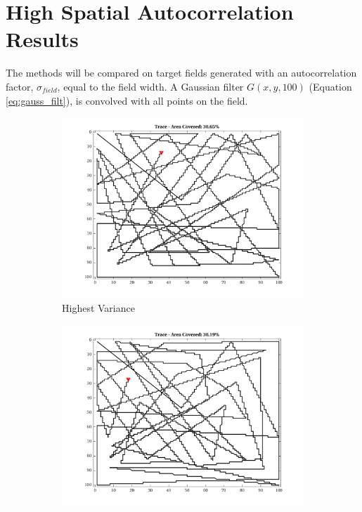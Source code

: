 \FloatBarrier
\clearpage

\section{High Spatial Autocorrelation Results}
The methods will be compared on target fields generated with an autocorrelation factor, $\sigma_{field}$, equal to the field width. A Gaussian filter $G(x,y,100)$ (Equation \ref{eq:gauss_filt}), is convolved with all points on the field.

\begin{figure}[htb!]
    \centering
    \begin{subfigure}[t]{0.3333\textwidth}
        \centering
        \includegraphics[width=\linewidth]{figures/hbresults/path_nhv_30p_100x100_sf_100_seed_2.png}
        \captionsetup{skip=0.20\baselineskip,size=footnotesize}
        \caption{Highest Variance}
    \end{subfigure}%
    \begin{subfigure}[t]{0.3333\textwidth}
        \centering
        \includegraphics[width=\linewidth]{figures/hbresults/path_nnhv_30p_100x100_sf_100_seed_2.png}

\end{subfigure}
\end{figure}
